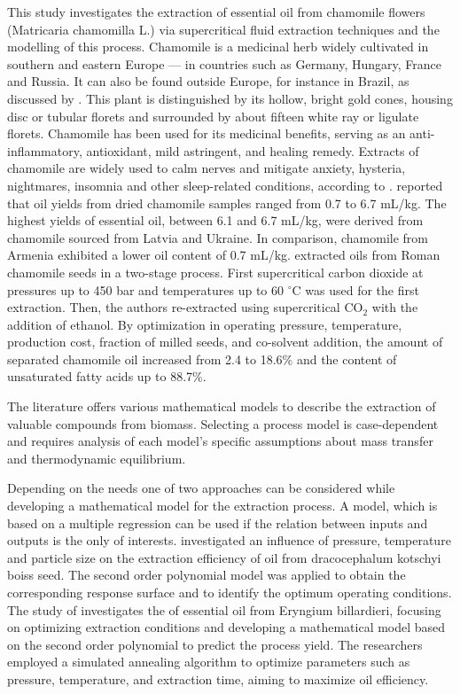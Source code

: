 \documentclass[../Article_Model_Parameters.tex]{subfiles}
\begin{document}
	This study investigates the extraction of essential oil from chamomile flowers (Matricaria chamomilla L.) via supercritical fluid extraction techniques and the modelling of this process. Chamomile is a medicinal herb widely cultivated in southern and eastern Europe — in countries such as Germany, Hungary, France and Russia. It can also be found outside Europe, for instance in Brazil, as discussed by \citet{Singh2011}. This plant is distinguished by its hollow, bright gold cones, housing disc or tubular florets and surrounded by about fifteen white ray or ligulate florets. Chamomile has been used for its medicinal benefits, serving as an anti-inflammatory, antioxidant, mild astringent, and healing remedy. Extracts of chamomile are widely used to calm nerves and mitigate anxiety, hysteria, nightmares, insomnia and other sleep-related conditions, according to \citet{Srivastava2009}. \citet{Orav2010} reported that oil yields from dried chamomile samples ranged from 0.7 to 6.7 mL/kg. The highest yields of essential oil, between 6.1 and 6.7 mL/kg, were derived from chamomile sourced from Latvia and Ukraine. In comparison, chamomile from Armenia exhibited a lower oil content of 0.7 mL/kg. {\color{blue}\citet{Milovanovic2023} extracted oils from Roman chamomile seeds in a two-stage process. First supercritical carbon dioxide at pressures up to 450 bar and temperatures up to 60 $^\circ$C was used for the first extraction. Then, the authors re-extracted using supercritical CO$_2$ with the addition of ethanol. By optimization in operating pressure, temperature, production cost, fraction of milled seeds, and co-solvent addition, the amount of separated chamomile oil increased from 2.4 to 18.6\% and the content of unsaturated fatty acids up to 88.7\%}.
	
	The literature offers various mathematical models to describe the extraction of valuable compounds from biomass. Selecting a process model is case-dependent and requires analysis of each model's specific assumptions about mass transfer and thermodynamic equilibrium.
	
	Depending on the needs one of two approaches can be considered while developing a mathematical model for the extraction process. A model, which is based on a multiple regression can be used if the relation between inputs and outputs is the only of interests. \citet{Sodeifian2017a} investigated an influence of pressure, temperature and particle size on the extraction efficiency of oil from dracocephalum kotschyi boiss seed. The second order polynomial model was applied to obtain the corresponding response surface and to identify the optimum operating conditions. The study of \citet{Sodeifian2017b} investigates the of essential oil from Eryngium billardieri, focusing on optimizing extraction conditions and developing a mathematical model based on the second order polynomial to predict the process yield. The researchers employed a simulated annealing algorithm to optimize parameters such as pressure, temperature, and extraction time, aiming to maximize oil efficiency.
		
\end{document}
